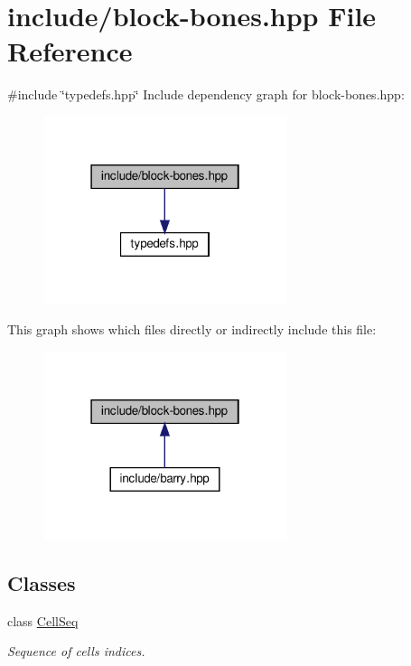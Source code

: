 \hypertarget{block-bones_8hpp}{}\section{include/block-\/bones.hpp File Reference}
\label{block-bones_8hpp}
{\ttfamily \#include \char`\"{}typedefs.\+hpp\char`\"{}}\newline
Include dependency graph for block-\/bones.hpp\+:\nopagebreak
\begin{figure}[H]
\begin{center}
\leavevmode
\includegraphics[width=202pt]{block-bones_8hpp__incl}
\end{center}
\end{figure}
This graph shows which files directly or indirectly include this file\+:\nopagebreak
\begin{figure}[H]
\begin{center}
\leavevmode
\includegraphics[width=202pt]{block-bones_8hpp__dep__incl}
\end{center}
\end{figure}
\subsection*{Classes}
\begin{DoxyCompactItemize}
\item 
class \hyperlink{class_cell_seq}{Cell\+Seq}
\begin{DoxyCompactList}\small\item\em Sequence of cells indices. \end{DoxyCompactList}\end{DoxyCompactItemize}
